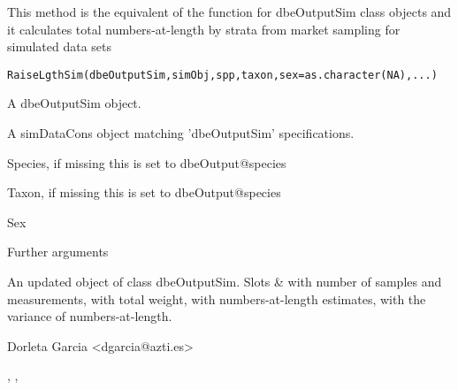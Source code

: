 \begin{Description}\relax
This method is the equivalent of the function  for dbeOutputSim class objects 
and it calculates total numbers-at-length by strata from market sampling for simulated data sets
\end{Description}
\begin{Usage}
\begin{verbatim}
RaiseLgthSim(dbeOutputSim,simObj,spp,taxon,sex=as.character(NA),...)
\end{verbatim}
\end{Usage}
\begin{Arguments}
\begin{ldescription}
\item[\code{dbeOutputSim}] A dbeOutputSim object.
\item[\code{simObj}] A simDataCons object matching 'dbeOutputSim' specifications.
\item[\code{spp}] Species, if missing this is set to dbeOutput@species
\item[\code{taxon}] Taxon, if missing this is set to dbeOutput@species
\item[\code{sex}] Sex
\item[\code{...}] Further arguments
\end{ldescription}
\end{Arguments}
\begin{Value}
An updated object of class dbeOutputSim.
Slots  \&  with number of samples and measurements,
 with total weight,
 with numbers-at-length estimates,
 with the variance of numbers-at-length.
\end{Value}
\begin{Author}\relax
Dorleta Garcia <dgarcia@azti.es>
\end{Author}
\begin{SeeAlso}\relax
{}, , 
\end{SeeAlso}

